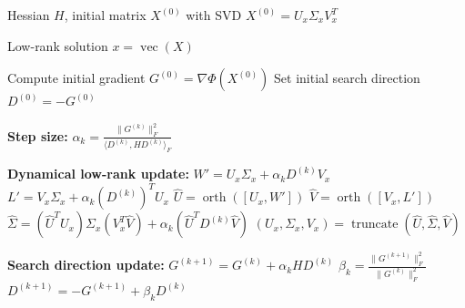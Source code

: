 \begin{algorithm}
\caption{Dynamical Low-Rank CG Scheme}
\label{alg:dlr-cg}
\begin{algorithmic}[1]

\Require Hessian $H$, initial matrix $X^{(0)}$ with SVD $X^{(0)} = U_x \Sigma_x V_x^T$

\Ensure Low-rank solution $x = \operatorname{vec}(X)$

\State Compute initial gradient $G^{(0)} = \nabla \Phi(X^{(0)})$
\State Set initial search direction $D^{(0)} = -G^{(0)}$


    \State \textbf{Step size:}
    \State $\displaystyle \alpha_k = \frac{\|G^{(k)}\|_F^2}{\langle D^{(k)}, H D^{(k)} \rangle_F}$

    \State \textbf{Dynamical low-rank update:}
    \State $W' = U_x \Sigma_x + \alpha_k D^{(k)} V_x$
    \State $L' = V_x \Sigma_x + \alpha_k (D^{(k)})^T U_x$
    \State $\hat U = \operatorname{orth}([U_x, W'])$
    \State $\hat V = \operatorname{orth}([V_x, L'])$
    \State $\hat \Sigma = (\hat U^T U_x)\Sigma_x(V_x^T \hat V) + \alpha_k (\hat U^T D^{(k)} \hat V)$
    \State $(U_x, \Sigma_x, V_x) = \operatorname{truncate}(\hat U, \hat \Sigma, \hat V)$

    \State \textbf{Search direction update:}
    \State $G^{(k+1)} = G^{(k)} + \alpha_k H D^{(k)}$ 
    \State $\displaystyle \beta_k =
    \frac{\| G^{(k+1)} \|^2_F}
         {\| G^{(k)} \|^2_F}$
    \State $D^{(k+1)} = -G^{(k+1)} + \beta_k D^{(k)}$

\EndFor

\end{algorithmic}
\end{algorithm}